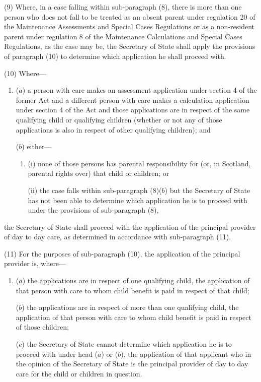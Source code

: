 \documentclass[12pt,a4paper]{article}
\begin{document}
(9) Where, in a case falling within sub-paragraph (8), there is more than one person who does not fall to be treated as an absent parent under regulation 20 of the Maintenance Assessments and Special Cases Regulations or as a non-resident parent under regulation 8 of the Maintenance Calculations and Special Cases Regulations, as the case may be, the Secretary of State shall apply the provisions of paragraph (10) to determine which application he shall proceed with.

(10) Where—
\begin{enumerate}\item[]
($a$) a person with care makes an assessment application under section 4 of the former Act and a different person with care makes a calculation application under section 4 of the Act and those applications are in respect of the same qualifying child or qualifying children (whether or not any of those applications is also in respect of other qualifying children); and

($b$) either—
\begin{enumerate}\item[]
(i) none of those persons has parental responsibility for (or, in Scotland, parental rights over) that child or children; or

(ii) the case falls within sub-paragraph (8)($b$)  but the Secretary of State has not been able to determine which application he is to proceed with under the provisions of sub-paragraph (8),
\end{enumerate}
\end{enumerate}
the Secretary of State shall proceed with the application of the principal provider of day to day care, as determined in accordance with sub-paragraph (11).

(11) For the purposes of sub-paragraph (10), the application of the principal provider is, where—
\begin{enumerate}\item[]
($a$) the applications are in respect of one qualifying child, the application of that person with care to whom child benefit is paid in respect of that child;

($b$) the applications are in respect of more than one qualifying child, the application of that person with care to whom child benefit is paid in respect of those children;

($c$) the Secretary of State cannot determine which application he is to proceed with under head ($a$)  or ($b$), the application of that applicant who in the opinion of the Secretary of State is the principal provider of day to day care for the child or children in question.
\end{enumerate}
\end{document}
